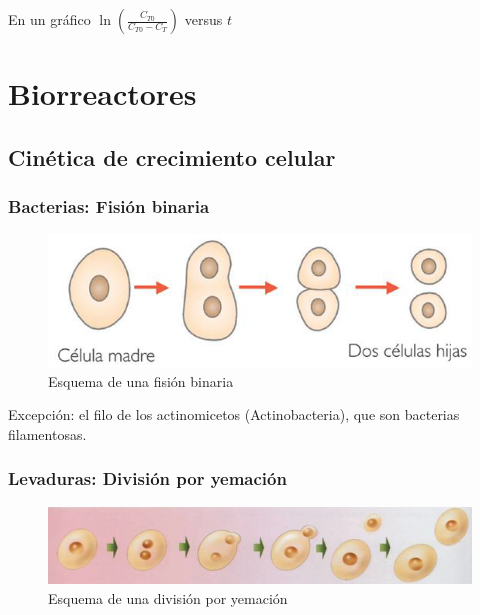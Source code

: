         En un gráfico \(\ln(\frac{C_{T0}}{C_{T0} - C_{T}})\) versus \(t\)
        
        \newpage
        
\section{Biorreactores}

    \subsection{Cinética de crecimiento celular}
    
        \subsubsection{Bacterias: Fisión binaria}
        
        \begin{figure}
            \centering
            \includegraphics[width=.5\textwidth]{img/esquemas/fision_binaria.png}
            \caption{Esquema de una fisión binaria}
            \label{fig:fision_binaria}
        \end{figure}
        
        \begin{quote}
            \textit{}
        \end{quote}
        
        Excepción: el filo de los actinomicetos (Actinobacteria), que son bacterias filamentosas.
        
        \subsubsection{Levaduras: División por yemación}
        
        \begin{figure}
            \centering
            \includegraphics[width=.8\textwidth]{img/esquemas/division_yemacion.png}
            \caption{Esquema de una división por yemación}
            \label{fig:division_yemacion}
        \end{figure}
        
